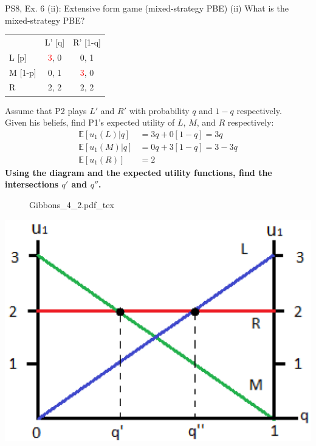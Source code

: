 \begin{frame}{PS8, Ex. 6 (ii): Extensive form game (mixed-strategy PBE)}
    (ii) What is the mixed-strategy PBE? \vspace{-8pt}
    \begin{multicols}{2}
      \begin{table}
        \begin{tabular}{l|c|c|}
          \multicolumn{1}{c}{} & \multicolumn{1}{c}{L' [q]} & \multicolumn{1}{c}{R' [1-q]} \\\cline{2-3}
          L [p]   & \textcolor{red}{3}, 0 & 0, \color{blue}1 \\\cline{2-3}
          M [1-p] & 0, \color{blue}1 & \textcolor{red}{3}, 0 \\\cline{2-3}
          R       & 2, \color{blue}2 & 2, \color{blue}2 \\\cline{2-3}
        \end{tabular}
      \end{table} \vspace{-4pt}
      Assume that P2 plays $L'$ and $R'$ with probability $q$ and $1-q$ respectively.\\\smallskip
      Given his beliefs, find P1's expected utility of $L$, $M$, and $R$ respectively: \vspace{-4pt}
      \begin{align*}
        \mathbb{E}[u_1(L)|q]&=3q+0[1-q]=3q\\
        \mathbb{E}[u_1(M)|q]&=0q+3[1-q]=3-3q\\
        \mathbb{E}[u_1(R)]&=2
      \end{align*}
      \textbf{Using the diagram and the expected utility functions, find the intersections $q'$ and $q''$.}
      \vfill\null\columnbreak
      \begin{figure}[!h]
        \center {}
        {Gibbons_4_2.pdf_tex}
      \end{figure}
      \includegraphics[width=1.1\columnwidth]{figures/Gibbons_4_2_E[u]}
      \vfill\null
    \end{multicols}
\end{frame}
